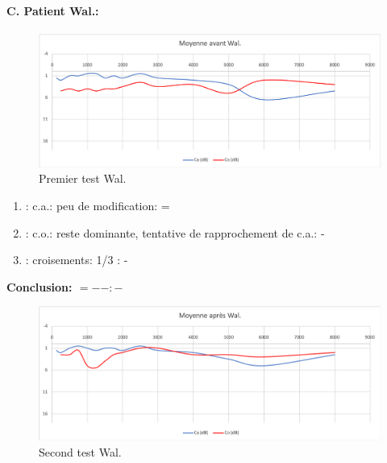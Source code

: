 \paragraph{C. Patient Wal.:}



\begin{figure}[th]
\centering
\includegraphics[width=1\linewidth]{images/graphiques/wal_pre.png}
\caption[Moyenne OG+OD]{Premier test Wal.}

\end{figure}

	\begin{enumerate}

 		\item : c.a.: peu de modification: =

 		\item : c.o.: reste dominante, tentative de rapprochement de c.a.: -
 		\item : croisements: 1/3 :  -

                \end{enumerate}

                \textbf{ Conclusion:  $= -  -        : -$ }

               \begin{figure}[th]
\centering
\includegraphics[width=1\linewidth]{images/graphiques/wal_post.png}
\caption[Moyenne OG+OD]{Second test Wal.}

\label{groupecontroleimage1}
\end{figure}
